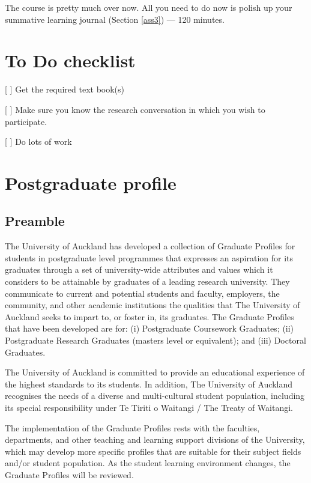 \documentclass[]{book}
\theoremstyle{definition}
\theoremstyle{definition}
\theoremstyle{definition}
\theoremstyle{remark}
\begin{document}
The course is pretty much over now. All you need to do now is polish up
your summative learning journal (Section \ref{ass3}) --- 120 minutes.

\hypertarget{todo-checklist}{%
\chapter{To Do checklist}\label{todo-checklist}}

{[} {]} Get the required text book(s)

{[} {]} Make sure you know the research conversation in which you wish
to participate.

{[} {]} Do lots of work

\hypertarget{appendix-appendix}{%
\appendix}


\hypertarget{profile}{%
\chapter{Postgraduate profile}\label{profile}}

\hypertarget{preamble}{%
\section{Preamble}\label{preamble}}

The University of Auckland has developed a collection of Graduate
Profiles for students in postgraduate level programmes that expresses an
aspiration for its graduates through a set of university-wide attributes
and values which it considers to be attainable by graduates of a leading
research university. They communicate to current and potential students
and faculty, employers, the community, and other academic institutions
the qualities that The University of Auckland seeks to impart to, or
foster in, its graduates. The Graduate Profiles that have been developed
are for: (i) Postgraduate Coursework Graduates; (ii) Postgraduate
Research Graduates (masters level or equivalent); and (iii) Doctoral
Graduates.

The University of Auckland is committed to provide an educational
experience of the highest standards to its students. In addition, The
University of Auckland recognises the needs of a diverse and
multi-cultural student population, including its special responsibility
under Te Tiriti o Waitangi / The Treaty of Waitangi.

The implementation of the Graduate Profiles rests with the faculties,
departments, and other teaching and learning support divisions of the
University, which may develop more specific profiles that are suitable
for their subject fields and/or student population. As the student
learning environment changes, the Graduate Profiles will be reviewed.
\end{document}
